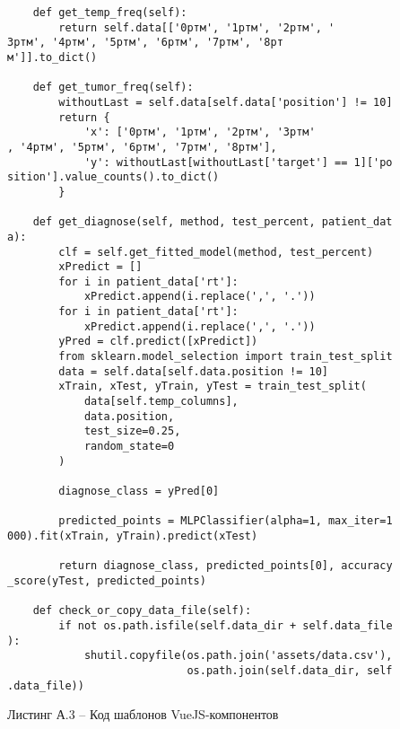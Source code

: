 \begin{verbatim}
    def get_temp_freq(self):
        return self.data[['0ртм', '1ртм', '2ртм', '
3ртм', '4ртм', '5ртм', '6ртм', '7ртм', '8рт
м']].to_dict()

    def get_tumor_freq(self):
        withoutLast = self.data[self.data['position'] != 10]
        return {
            'x': ['0ртм', '1ртм', '2ртм', '3ртм'
, '4ртм', '5ртм', '6ртм', '7ртм', '8ртм'],
            'y': withoutLast[withoutLast['target'] == 1]['po
sition'].value_counts().to_dict()
        }

    def get_diagnose(self, method, test_percent, patient_dat
a):
        clf = self.get_fitted_model(method, test_percent)
        xPredict = []
        for i in patient_data['rt']:
            xPredict.append(i.replace(',', '.'))
        for i in patient_data['rt']:
            xPredict.append(i.replace(',', '.'))
        yPred = clf.predict([xPredict])
        from sklearn.model_selection import train_test_split
        data = self.data[self.data.position != 10]
        xTrain, xTest, yTrain, yTest = train_test_split(
            data[self.temp_columns],
            data.position,
            test_size=0.25,
            random_state=0
        )

        diagnose_class = yPred[0]

        predicted_points = MLPClassifier(alpha=1, max_iter=1
000).fit(xTrain, yTrain).predict(xTest)

        return diagnose_class, predicted_points[0], accuracy
_score(yTest, predicted_points)

    def check_or_copy_data_file(self):
        if not os.path.isfile(self.data_dir + self.data_file
):
            shutil.copyfile(os.path.join('assets/data.csv'),
                            os.path.join(self.data_dir, self
.data_file))

\end{verbatim}
\vspace{8mm}
\Large
\par
Листинг А.3 -- Код шаблонов VueJS-компонентов
\vspace{8mm}
\large
